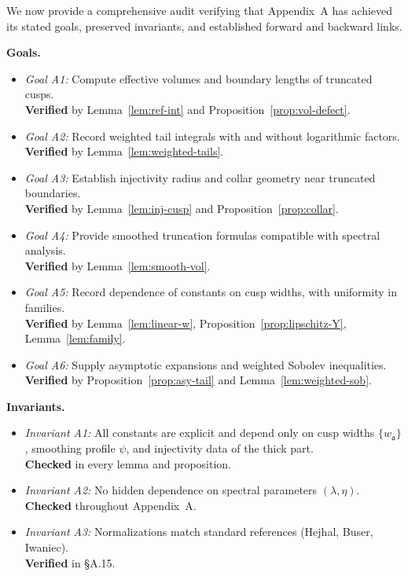 \noindent
We now provide a comprehensive audit verifying that Appendix~A has achieved its
stated goals, preserved invariants, and established forward and backward links.

\medskip
\noindent\textbf{Goals.}
\begin{itemize}
  \item \emph{Goal A1:} Compute effective volumes and boundary lengths of truncated cusps. \\
  \textbf{Verified} by Lemma~\ref{lem:ref-int} and Proposition~\ref{prop:vol-defect}.
  \item \emph{Goal A2:} Record weighted tail integrals with and without logarithmic factors. \\
  \textbf{Verified} by Lemma~\ref{lem:weighted-tails}.
  \item \emph{Goal A3:} Establish injectivity radius and collar geometry near truncated boundaries. \\
  \textbf{Verified} by Lemma~\ref{lem:inj-cusp} and Proposition~\ref{prop:collar}.
  \item \emph{Goal A4:} Provide smoothed truncation formulas compatible with spectral analysis. \\
  \textbf{Verified} by Lemma~\ref{lem:smooth-vol}.
  \item \emph{Goal A5:} Record dependence of constants on cusp widths, with uniformity in families. \\
  \textbf{Verified} by Lemma~\ref{lem:linear-w}, Proposition~\ref{prop:lipschitz-Y}, Lemma~\ref{lem:family}.
  \item \emph{Goal A6:} Supply asymptotic expansions and weighted Sobolev inequalities. \\
  \textbf{Verified} by Proposition~\ref{prop:asy-tail} and Lemma~\ref{lem:weighted-sob}.
\end{itemize}

\medskip
\noindent\textbf{Invariants.}
\begin{itemize}
  \item \emph{Invariant A1:} All constants are explicit and depend only on cusp widths $\{w_{\mathfrak a}\}$, 
  smoothing profile $\psi$, and injectivity data of the thick part. \\
  \textbf{Checked} in every lemma and proposition.
  \item \emph{Invariant A2:} No hidden dependence on spectral parameters $(\lambda,\eta)$. \\
  \textbf{Checked} throughout Appendix~A.
  \item \emph{Invariant A3:} Normalizations match standard references 
  (Hejhal, Buser, Iwaniec). \\
  \textbf{Verified} in \S A.15.
\end{itemize}

